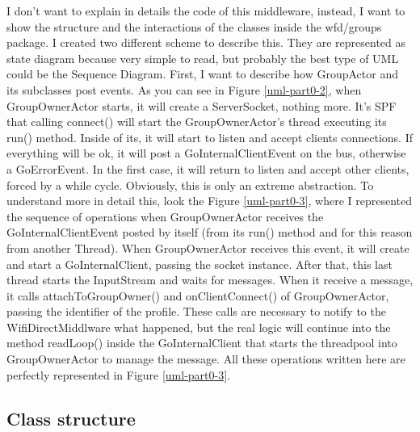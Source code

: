 I don't want to explain in details the code of this middleware, instead, I want to show the structure and the interactions of the classes inside the wfd/groups package.
I created two different scheme to describe this. They are represented as state diagram because very simple to read, but probably the best type of UML could be the Sequence Diagram.
First, I want to describe how \textsf{GroupActor} and its subclasses post events. As you can see in Figure \ref{uml-part0-2}, when \textsf{GroupOwnerActor} starts, it will create a \textsf{ServerSocket}, nothing more. It's SPF that calling \textsf{connect()} will start the \textsf{GroupOwnerActor}'s thread executing its \textsf{run()} method. Inside of its, it will start to listen and accept clients connections. If everything will be ok, it will post a \textsf{GoInternalClientEvent} on the bus, otherwise a \textsf{GoErrorEvent}. In the first case, it will return to listen and accept other clients, forced by a while cycle. Obviously, this is only an extreme abstraction. To understand more in detail this, look the Figure \ref{uml-part0-3}, where I represented the sequence of operations when \textsf{GroupOwnerActor} receives the \textsf{GoInternalClientEvent} posted by itself (from its \textsf{run()} method and for this reason from another Thread).
When \textsf{GroupOwnerActor} receives this event, it will create and start a \textsf{GoInternalClient}, passing the socket instance. After that, this last thread starts the InputStream and waits for messages. 
When it receive a message, it calls \textsf{attachToGroupOwner()} and \textsf{onClientConnect()} of \textsf{GroupOwnerActor}, passing the identifier of the profile. These calls are necessary to notify to the \textsf{WifiDirectMiddlware} what happened, but the real logic will continue into the method \textsf{readLoop()} inside the \textsf{GoInternalClient} that starts the threadpool into \textsf{GroupOwnerActor} to manage the message. All these operations written here are perfectly represented in Figure \ref{uml-part0-3}.


\subsection{Class structure}

